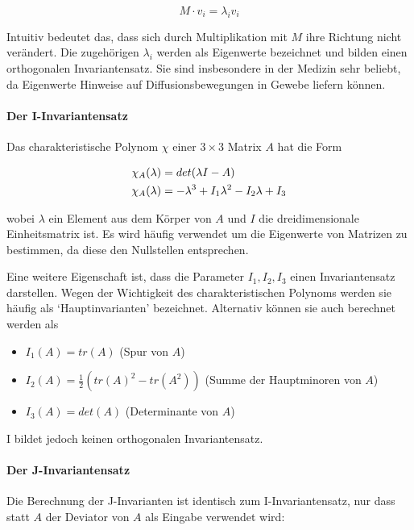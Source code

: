 \documentclass[a4paper,fontsize=12pt,toc=bib,halfparskip]{scrartcl}
\begin{document}
\begin{equation}
	M \cdot v_i = \lambda_i v_i
\end{equation}

Intuitiv bedeutet das, dass sich durch Multiplikation mit $M$ ihre Richtung nicht ver\"andert. Die zugeh\"origen $\lambda_i$ werden als Eigenwerte bezeichnet und bilden einen orthogonalen Invariantensatz. Sie sind insbesondere in der Medizin sehr beliebt, da Eigenwerte Hinweise auf Diffusionsbewegungen in Gewebe liefern k\"onnen.

\paragraph{Der I-Invariantensatz}
Das charakteristische Polynom $\chi$ einer $3\times3$ Matrix $A$ hat die Form

\begin{equation}
	\centering
	\begin{split}
	&\chi_A(\lambda) = det(\lambda I - A)\\
	&\chi_A(\lambda) = -\lambda^3 + I_1\lambda^2 - I_2\lambda + I_3
	\end{split}
\end{equation}

wobei $\lambda$ ein Element aus dem K\"orper von $A$ und $I$ die dreidimensionale Einheitsmatrix ist. Es wird h\"aufig verwendet um die Eigenwerte von Matrizen zu bestimmen, da diese den Nullstellen entsprechen.

Eine weitere Eigenschaft ist, dass die Parameter $I_1, I_2, I_3$ einen Invariantensatz darstellen. Wegen der Wichtigkeit des charakteristischen Polynoms werden sie h\"aufig als `Hauptinvarianten' bezeichnet. Alternativ k\"onnen sie auch berechnet werden als

\begin{itemize}
	\item $I_1(A) = tr(A)$ (Spur von $A$)
	\item $I_2(A) = \frac{1}{2}(tr(A)^2 - tr(A^2))$ (Summe der Hauptminoren von $A$)
	\item $I_3(A) = det(A)$ (Determinante von $A$)
\end{itemize}
I bildet jedoch keinen orthogonalen Invariantensatz.

\paragraph{Der J-Invariantensatz}
 Die Berechnung der J-Invarianten ist identisch zum I-Invariantensatz, nur dass statt $A$ der Deviator von $A$ als Eingabe verwendet wird:
\end{document}
